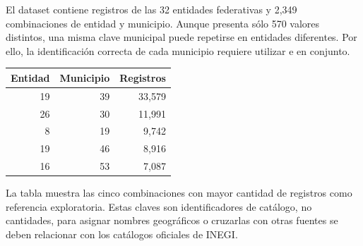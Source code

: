 \documentclass[11pt,letterpaper]{article}
\begin{document}
\begin{nota}
El dataset contiene registros de las 32 entidades federativas y 2,349
combinaciones de entidad y municipio. Aunque  presenta sólo
570 valores distintos, una misma clave municipal puede repetirse en entidades
diferentes. Por ello, la identificación correcta de cada municipio requiere
utilizar  e  en conjunto.

\vspace{0.4em}
\begin{tabular}{rrr}
    \toprule
    \textbf{Entidad} & \textbf{Municipio} & \textbf{Registros} \\
    \midrule
    19 & 39 & 33,579 \\
    26 & 30 & 11,991 \\
    8 & 19 & 9,742 \\
    19 & 46 & 8,916 \\
    16 & 53 & 7,087 \\
    \bottomrule
\end{tabular}

\vspace{0.4em}
La tabla muestra las cinco combinaciones con mayor cantidad de registros como
referencia exploratoria. Estas claves son identificadores de catálogo, no
cantidades, para asignar nombres geográficos o cruzarlas con otras fuentes se
deben relacionar con los catálogos oficiales de INEGI.
\end{nota}
\end{document}

